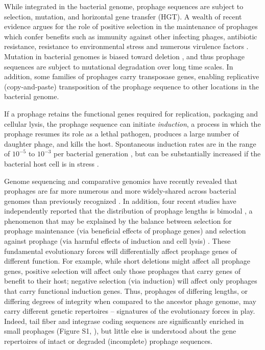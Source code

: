 While integrated in the bacterial genome, prophage sequences are subject to selection, mutation, and horizontal gene transfer (HGT).  A wealth of recent evidence argues for the role of positive selection in the maintenance of prophages which confer benefits such as immunity against other infecting phages, antibiotic resistance, resistance to environmental stress and numerous virulence factors \cite{harrison_ecological_2017}.  Mutation in bacterial genomes is biased toward deletion \cite{kuo_deletional_2009,mira_deletional_2001, danneels_patterns_2018}, and thus prophage sequences are subject to mutational degradation over long time scales.  In addition, some families of prophages carry transposase genes, enabling replicative (copy-and-paste) transposition of the prophage sequence to other locations in the bacterial genome. 

If a prophage retains the functional genes required for replication, packaging and cellular lysis, the prophage sequence can initiate \emph{induction}, a process in which the prophage resumes its role as a lethal pathogen, produces a large number of daughter phage, and kills the host.  Spontaneous induction rates  are in the range of $10^{-5}$ to $10^{-3}$ per bacterial generation \cite{little_robustness_1999,zong_lysogen_2010}, but can be substantially increased if the bacterial host cell is in stress \cite{alexeeva_spontaneously_2018}.

Genome sequencing and comparative genomics have recently revealed that prophages are far more numerous and more widely-shared across bacterial genomes than previously recognized \cite{costa_genomic_2018, mottawea_salmonella_2018}.  In addition, four recent studies have independently reported that the distribution of prophage lengths is bimodal \cite{bobay_pervasive_2014, brueggemann_pneumococcal_2017, crispim_screening_2018, leplae_aclame:_2010}, a phenomenon that may be explained by the balance between selection for prophage maintenance (via beneficial effects of prophage genes) and selection against prophage (via harmful effects of induction and cell lysis) \cite{khan_quantifying_2019}.
These fundamental evolutionary forces will differentially affect prophage genes of different function.  For example, while short deletions might affect all prophage genes, positive selection will affect only those prophages that carry genes of benefit to their host; negative selection (via induction) will affect only prophages that carry functional induction genes.  Thus, prophages of differing lengths, or differing degrees of integrity when compared to the ancestor phage genome, may carry different genetic repertoires -- signatures of the evolutionary forces in play. Indeed, tail fiber and integrase coding sequences are significantly enriched in small prophages (Figure S1, \cite{bobay_pervasive_2014}), but little else is understood about the gene repertoires of intact or degraded (incomplete) prophage sequences. 

